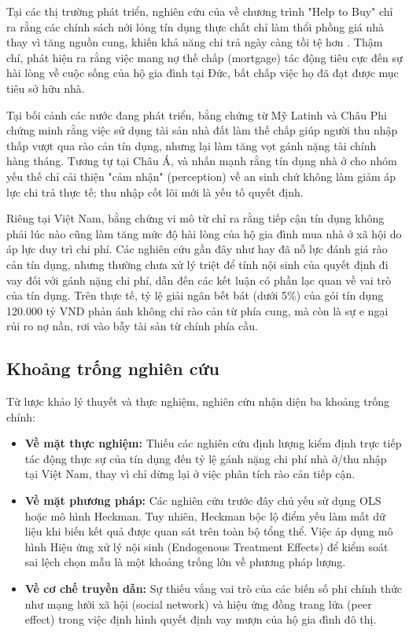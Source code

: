 \documentclass[12pt,a4paper]{report}
\begin{document}
Tại các thị trường phát triển, nghiên cứu của \textcite{Carozzi2024} về chương trình "Help to Buy" chỉ ra rằng các chính sách nới lỏng tín dụng thực chất chỉ làm thổi phồng giá nhà thay vì tăng nguồn cung, khiến khả năng chi trả ngày càng tồi tệ hơn \parencite{Larson2025, Brown2013}. Thậm chí, \textcite{Will2025} phát hiện ra rằng việc mang nợ thế chấp (mortgage) tác động tiêu cực đến sự hài lòng về cuộc sống của hộ gia đình tại Đức, bất chấp việc họ đã đạt được mục tiêu sở hữu nhà.

Tại bối cảnh các nước đang phát triển, bằng chứng từ Mỹ Latinh và Châu Phi \parencite{arrieta2005Mortgage, Edwin2023} chứng minh rằng việc sử dụng tài sản nhà đất làm thế chấp giúp người thu nhập thấp vượt qua rào cản tín dụng, nhưng lại làm tăng vọt gánh nặng tài chính hàng tháng. Tương tự tại Châu Á, \textcite{sharma2024saving} và \textcite{Syed2025} nhấn mạnh rằng tín dụng nhà ở cho nhóm yếu thế chỉ cải thiện "cảm nhận" (perception) về an sinh chứ không làm giảm áp lực chi trả thực tế; thu nhập cốt lõi mới là yếu tố quyết định.

Riêng tại Việt Nam, bằng chứng vi mô từ \textcite{Nguyen2016} chỉ ra rằng tiếp cận tín dụng không phải lúc nào cũng làm tăng mức độ hài lòng của hộ gia đình mua nhà ở xã hội do áp lực duy trì chi phí. Các nghiên cứu gần đây như \textcite{UEH2023} hay \textcite{Nguyen2024} đã nỗ lực đánh giá rào cản tín dụng, nhưng thường chưa xử lý triệt để tính nội sinh của quyết định đi vay đối với gánh nặng chi phí, dẫn đến các kết luận có phần lạc quan về vai trò của tín dụng. Trên thực tế, tỷ lệ giải ngân bết bát (dưới 5\%) của gói tín dụng 120.000 tỷ VND \parencite{SBV2025} phản ánh không chỉ rào cản từ phía cung, mà còn là sự e ngại rủi ro nợ nần, rơi vào bẫy tài sản từ chính phía cầu.

\subsection{Khoảng trống nghiên cứu}
Từ lược khảo lý thuyết và thực nghiệm, nghiên cứu nhận diện ba khoảng trống chính:
\begin{itemize}
	\item \textbf{Về mặt thực nghiệm:} Thiếu các nghiên cứu định lượng kiểm định trực tiếp tác động thực sự của tín dụng đến tỷ lệ gánh nặng chi phí nhà ở/thu nhập tại Việt Nam, thay vì chỉ dừng lại ở việc phân tích rào cản tiếp cận.
	\item \textbf{Về mặt phương pháp:} Các nghiên cứu trước đây chủ yếu sử dụng OLS hoặc mô hình Heckman. Tuy nhiên, Heckman bộc lộ điểm yếu làm mất dữ liệu khi biến kết quả được quan sát trên toàn bộ tổng thể. Việc áp dụng mô hình Hiệu ứng xử lý nội sinh (Endogenous Treatment Effects) để kiểm soát sai lệch chọn mẫu là một khoảng trống lớn về phương pháp lượng.
	\item \textbf{Về cơ chế truyền dẫn:} Sự thiếu vắng vai trò của các biến số phi chính thức như mạng lưới xã hội (social network) và hiệu ứng đồng trang lứa (peer effect) trong việc định hình quyết định vay mượn của hộ gia đình đô thị.
\end{itemize}
\end{document}
